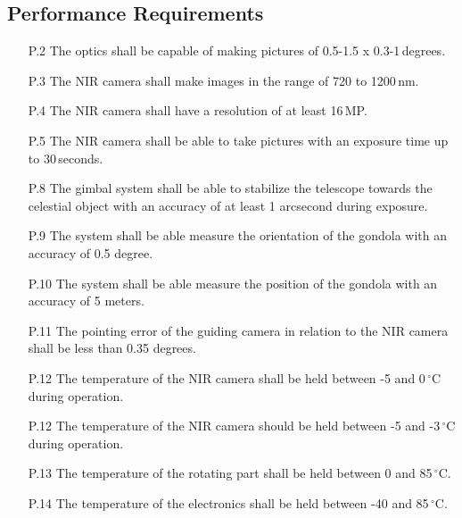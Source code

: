 \subsection{Performance Requirements}

\begin{enumerate}[topsep=0pt,itemsep=-1ex,partopsep=1ex,parsep=1ex]
    \item[P.2] The optics shall be capable of making pictures of 0.5-1.5 x 0.3-1\,degrees.
    \item[P.3] The NIR camera shall make images in the range of 720 to 1200\,nm.
    \item[P.4] The NIR camera shall have a resolution of at least 16\,MP.
    \item[P.5] The NIR camera shall be able to take pictures with an exposure time up to 30\,seconds.
    \item[P.8] The gimbal system shall be able to stabilize the telescope towards the celestial object with an accuracy of at least 1 arcsecond during exposure.
    \item[P.9] The system shall be able measure the orientation of the gondola with an accuracy of 0.5 degree.
	\item[P.10] The system shall be able measure the position of the gondola with an accuracy of 5 meters.
	\item[P.11] The pointing error of the guiding camera in relation to the NIR camera shall be less than 0.35 degrees.
	\item[P.12]The temperature of the NIR camera shall be held between -5 and 0\,$^\circ$C during operation.
	\item[P.12] The temperature of the NIR camera should be held between -5 and -3\,$^\circ$C during operation.
	\item[P.13] The temperature of the rotating part shall be held between 0 and 85\,$^\circ$C.
	\item[P.14] The temperature of the electronics shall be held between -40 and 85\,$^\circ$C.
\end{enumerate}
